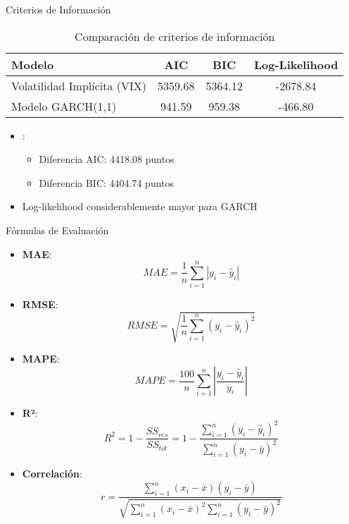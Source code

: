\begin{frame}{Criterios de Información}
    \begin{table}
        \centering
        \begin{tabular}{lccc}
            \toprule
            \textbf{Modelo} & \textbf{AIC} & \textbf{BIC} & \textbf{Log-Likelihood} \\
            \midrule
            Volatilidad Implícita (VIX) & 5359.68 & 5364.12 & -2678.84 \\
            Modelo GARCH(1,1) & 941.59 & 959.38 & -466.80 \\
            \bottomrule
        \end{tabular}
        \caption{Comparación de criterios de información}
    \end{table}
    
    \vspace{0.5em}
    
    \begin{itemize}
        \item<2-> :
        \begin{itemize}
            \item Diferencia AIC: 4418.08 puntos
            \item Diferencia BIC: 4404.74 puntos
        \end{itemize}
        \item<3-> Log-likelihood considerablemente mayor para GARCH
    \end{itemize}
\end{frame}

\begin{frame}{Fórmulas de Evaluación}
    \begin{itemize}
        \item \textbf{MAE}:
        {\footnotesize $$MAE = \frac{1}{n}\sum_{i=1}^{n}|y_i - \hat{y}_i|$$}
  
        \item \textbf{RMSE}:
        {\footnotesize $$RMSE = \sqrt{\frac{1}{n}\sum_{i=1}^{n}(y_i - \hat{y}_i)^2}$$}
  
        \item \textbf{MAPE}:
        {\footnotesize $$MAPE = \frac{100}{n}\sum_{i=1}^{n}\left|\frac{y_i - \hat{y}_i}{y_i}\right|$$}
  
        \item \textbf{R²}:
        {\footnotesize $$R^2 = 1 - \frac{SS_{res}}{SS_{tot}} = 1 - \frac{\sum_{i=1}^{n}(y_i - \hat{y}_i)^2}{\sum_{i=1}^{n}(y_i - \bar{y})^2}$$}
  
        \item \textbf{Correlación}:
        {\footnotesize $$r = \frac{\sum_{i=1}^{n}(x_i - \bar{x})(y_i - \bar{y})}{\sqrt{\sum_{i=1}^{n}(x_i - \bar{x})^2 \sum_{i=1}^{n}(y_i - \bar{y})^2}}$$}
    \end{itemize}
\end{frame}

